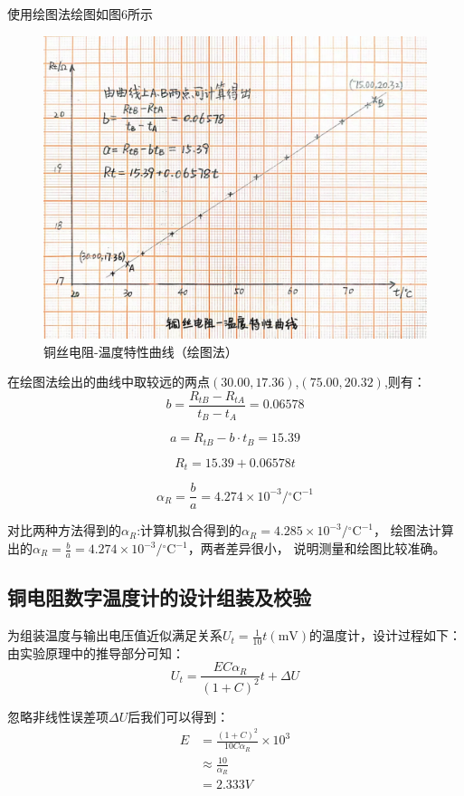 \documentclass[UTF8]{ctexart}
\begin{document}
使用绘图法绘图如图6所示
\begin{figure}[ht]
    \centering
    \includegraphics[scale=0.25]{手绘铜丝电阻温度.jpg}
    \caption{铜丝电阻-温度特性曲线（绘图法）}
    \label{fig:label}
\end{figure}

在绘图法绘出的曲线中取较远的两点$ (30.00,17.36)$,$(75.00,20.32)$,则有：
$$
b=\frac{R_{tB}-R_{tA}}{t_B-t_A}=0.06578
$$

$$
a=R_{tB}-b\cdot t_B= 15.39
$$

$$
R_t=15.39+0.06578t
$$

$$
\alpha_R=\frac{b}{a}=4.274\times 10^{-3}/{ }^{\circ}\mathrm{C}^{-1}
$$

对比两种方法得到的$\alpha_R$:计算机拟合得到的$\alpha_R=4.285\times 10^{-3} /{ }^{\circ}\mathrm{C}^{-1}$，
绘图法计算出的$\alpha_R=\frac{b}{a}=4.274\times 10^{-3}/{ }^{\circ}\mathrm{C}^{-1}$，两者差异很小，
说明测量和绘图比较准确。

\subsection{铜电阻数字温度计的设计组装及校验}
为组装温度与输出电压值近似满足关系$U_{t}=\frac{1}{10} t(\mathrm{mV}) $的温度计，设计过程如下：\\

由实验原理中的推导部分可知：
$$
    U_{t}  = \frac{E C \alpha_{R}}{(1+C)^{2}} t+\Delta U 
$$

忽略非线性误差项$\Delta U$后我们可以得到：
\begin{align}
    E & =  \frac{(1+C)^{2}}{10 C \alpha_{R}} \times 10^{3} \nonumber\\
    &\approx\frac{10}{ \alpha_{R}}\nonumber\\
    &=2.333 V\nonumber\\
\end{align}
\end{document}
